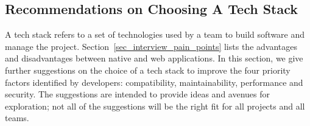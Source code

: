 \documentclass[final, 3p, times, authoryear]{elsarticle}
\begin{document}
\subsection{Recommendations on Choosing A Tech Stack}
\label{sec_recommendations_tech_stack}

A tech stack refers to a set of technologies used by a team to build software
and manage the project. Section~\ref{sec_interview_pain_points} lists the
advantages and disadvantages between native and web applications. In this
section, we give further suggestions on the choice of a tech stack to improve
the four priority factors identified by developers: compatibility,
maintainability, performance and security.  The suggestions are intended to
provide ideas and avenues for exploration; not all of the suggestions will be
the right fit for all projects and all teams.
\end{document}

